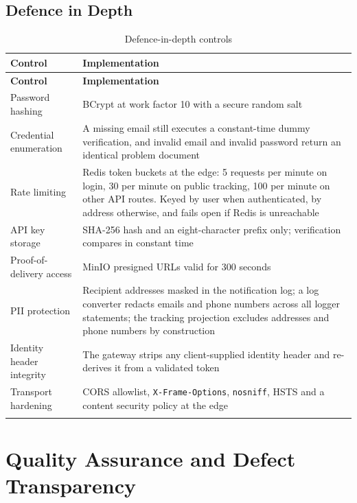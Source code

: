 \documentclass[11pt,a4paper,oneside,openany]{report}
\newcommand{\code}[1]{\texttt{\small #1}}
\begin{document}
\section{Defence in Depth}
\begin{center}
\small
\begin{longtable}{@{}p{4.3cm}p{9.9cm}@{}}
\toprule
\textbf{Control} & \textbf{Implementation} \\
\midrule
\endfirsthead
\toprule
\textbf{Control} & \textbf{Implementation} \\
\midrule
\endhead
Password hashing & BCrypt at work factor 10 with a secure random salt \\
\addlinespace
Credential enumeration & A missing email still executes a constant-time dummy verification, and
invalid email and invalid password return an identical problem document \\
\addlinespace
Rate limiting & Redis token buckets at the edge: 5 requests per minute on login, 30 per minute on
public tracking, 100 per minute on other API routes. Keyed by user when authenticated, by address
otherwise, and fails open if Redis is unreachable \\
\addlinespace
API key storage & SHA-256 hash and an eight-character prefix only; verification compares in
constant time \\
\addlinespace
Proof-of-delivery access & MinIO presigned URLs valid for 300 seconds \\
\addlinespace
PII protection & Recipient addresses masked in the notification log; a log converter redacts
emails and phone numbers across all logger statements; the tracking projection excludes addresses
and phone numbers by construction \\
\addlinespace
Identity header integrity & The gateway strips any client-supplied identity header and re-derives
it from a validated token \\
\addlinespace
Transport hardening & CORS allowlist, \code{X-Frame-Options}, \code{nosniff}, HSTS and a content
security policy at the edge \\
\bottomrule
\caption{Defence-in-depth controls}\label{tab:defence}
\end{longtable}
\end{center}

\chapter{Quality Assurance and Defect Transparency}
\end{document}
